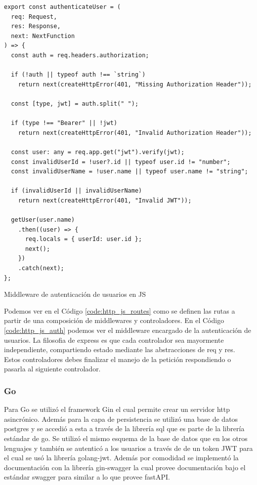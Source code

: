 \documentclass[11pt]{article}
\let\Oldsubsubsection\subsubsection
\renewcommand{\subsubsection}{\FloatBarrier\Oldsubsubsection}
\begin{document}
\begin{listing}
\begin{verbatim}
export const authenticateUser = (
  req: Request,
  res: Response,
  next: NextFunction
) => {
  const auth = req.headers.authorization;

  if (!auth || typeof auth !== `string`)
    return next(createHttpError(401, "Missing Authorization Header"));

  const [type, jwt] = auth.split(" ");

  if (type !== "Bearer" || !jwt)
    return next(createHttpError(401, "Invalid Authorization Header"));

  const user: any = req.app.get("jwt").verify(jwt);
  const invalidUserId = !user?.id || typeof user.id != "number";
  const invalidUserName = !user.name || typeof user.name != "string";

  if (invalidUserId || invalidUserName)
    return next(createHttpError(401, "Invalid JWT"));

  getUser(user.name)
    .then((user) => {
      req.locals = { userId: user.id };
      next();
    })
    .catch(next);
};
\end{verbatim}
\caption{Middleware de autenticación de usuarios en JS}
\label{code:http_js_auth}
\end{listing}

Podemos ver en el Código \ref{code:http_js_routes} como se definen las rutas a partir de una composición de middlewares y controladores.
En el Código \ref{code:http_js_auth} podemos ver el middleware encargado de la autenticación de usuarios. La filosofia de express es que cada controlador sea mayormente independiente, compartiendo estado mediante las abstracciones de req y res. Estos controladores debes finalizar el manejo de la petición respondiendo o pasarla al siguiente controlador.

\subsubsection{Go}

Para Go se utilizó el framework Gin el cual permite crear un servidor http asincrónico. Además para la capa de persistencia se utilizó una base de datos postgres y se accedió a esta a través de la librería sql que es parte de la librería estándar de go. Se utilizó el mismo esquema de la base de datos que en los otros lenguajes y también se autenticó a los usuarios a través de de un token JWT para el cual se usó la librería golang-jwt. Además por comodidad se implementó la documentación con la librería gin-swagger la cual provee documentación bajo el estándar swagger para similar a lo que provee fastAPI.
\end{document}
